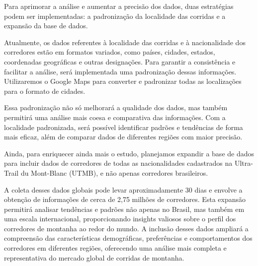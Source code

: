 Para aprimorar a análise e aumentar a precisão dos dados, duas estratégias podem ser implementadas: a padronização da localidade das corridas e a expansão da base de dados.

Atualmente, os dados referentes à localidade das corridas e à nacionalidade dos corredores estão em formatos variados, como países, cidades, estados, coordenadas geográficas e outras designações. Para garantir a consistência e facilitar a análise, será implementada uma padronização dessas informações. Utilizaremos o Google Maps para converter e padronizar todas as localizações para o formato de cidades.

Essa padronização não só melhorará a qualidade dos dados, mas também permitirá uma análise mais coesa e comparativa das informações. Com a localidade padronizada, será possível identificar padrões e tendências de forma mais eficaz, além de comparar dados de diferentes regiões com maior precisão.

Ainda, para enriquecer ainda mais o estudo, planejamos expandir a base de dados para incluir dados de corredores de todas as nacionalidades cadastrados na Ultra-Trail du Mont-Blanc (UTMB), e não apenas corredores brasileiros.

A coleta desses dados globais pode levar aproximadamente 30 dias e envolve a obtenção de informações de cerca de 2,75 milhões de corredores. Esta expansão permitirá analisar tendências e padrões não apenas no Brasil, mas também em uma escala internacional, proporcionando insights valiosos sobre o perfil dos corredores de montanha ao redor do mundo. A inclusão desses dados ampliará a compreensão das características demográficas, preferências e comportamentos dos corredores em diferentes regiões, oferecendo uma análise mais completa e representativa do mercado global de corridas de montanha.




